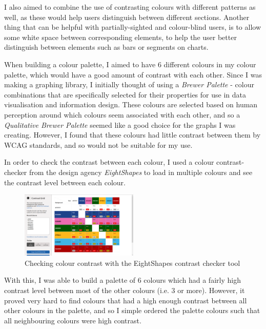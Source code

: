 \documentclass[ %
                    author={Aleena Baig},
                supervisor={Dr Simon Lock},
                    degree={BSc},
                     title={On Making Web Accessible Graphs},
                  subtitle={},
                      year={2019} ]{dissertation}
\begin{document}
I also aimed to combine the use of contrasting colours with different patterns as well, as these would help users distinguish between different sections. Another thing that can be helpful with partially-sighted and colour-blind users, is to allow some white space between corresponding elements, to help the user better distinguish between elements such as bars or segments on charts.

When building a colour palette, I aimed to have 6 different colours in my colour palette, which would have a good amount of contrast with each other. Since I was making a graphing library, I initially thought of using a \textit{Brewer Palette} - colour combinations that are specifically selected for their properties for use in data visualisation and information design. These colours are selected based on human perception around which colours seem associated with each other, and so a \textit{Qualitative Brewer Palette} seemed like a good choice for the graphs I was creating. However, I found that these colours had little contrast between them by WCAG standards, and so would not be suitable for my use.

In order to check the contrast between each colour, I used a colour contrast-checker from the design agency \textit{EightShapes} to load in multiple colours and see the contrast level between each colour.

\begin{figure}[h]
\caption{Checking colour contrast with the EightShapes contrast checker tool}
\centering
\includegraphics[width=0.5\textwidth]{images/EightShapeColourChecker.png}
\end{figure}

With this, I was able to build a palette of 6 colours which had a fairly high contrast level between most of the other colours (i.e. 3 or more). However, it proved very hard to find colours that had a high enough contrast between all other colours in the palette, and so I simple ordered the palette colours such that all neighbouring colours were high contrast.

\end{document}
